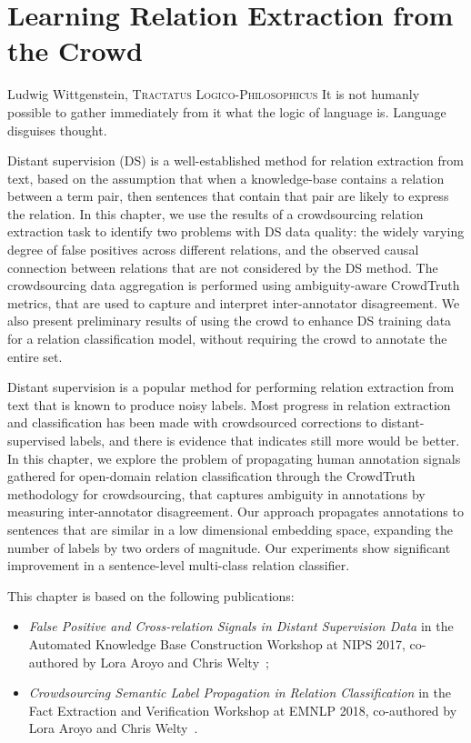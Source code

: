 \chapter{Learning Relation Extraction from the Crowd}
\label{chap:od-rel-ex}

\begin{chapquote}{Ludwig Wittgenstein, \textsc{Tractatus Logico-Philosophicus}}
It is not humanly possible to gather immediately from it what the logic of language is. Language disguises thought.
\end{chapquote}

Distant supervision (DS) is a well-established method for relation extraction from text, based on the assumption that when a knowledge-base contains a relation between a term pair, then sentences that contain that pair are likely to express the relation. In this chapter, we use the results of a crowdsourcing relation extraction task to identify two problems with DS data quality: the widely varying degree of false positives across different relations, and the observed causal connection between relations that are not considered by the DS method. The crowdsourcing data aggregation is performed using ambiguity-aware CrowdTruth metrics, that are used to capture and interpret inter-annotator disagreement. We also present preliminary results of using the crowd to enhance DS training data for a relation classification model, without requiring the crowd to annotate the entire set. 

Distant supervision is a popular method for performing relation extraction from text that is known to produce noisy labels.  Most progress in relation extraction and classification has been made with crowdsourced corrections to distant-supervised labels, and there is evidence that indicates still more would be better. In this chapter, we explore the problem of propagating human annotation signals gathered for open-domain relation classification through the CrowdTruth methodology for crowdsourcing, that captures ambiguity in annotations by measuring inter-annotator disagreement. Our approach propagates annotations to sentences that are similar in a low dimensional embedding space, expanding the number of labels by two orders of magnitude.  Our experiments show significant improvement in a sentence-level multi-class relation classifier.

This chapter is based on the following publications:

\begin{itemize}

\item \textit{False Positive and Cross-relation Signals in Distant Supervision Data} in the Automated Knowledge Base Construction Workshop at NIPS 2017, co-authored by Lora Aroyo and Chris Welty~\cite{dumitrache2017false};

\item \textit{Crowdsourcing Semantic Label Propagation in Relation Classification} in the Fact Extraction and Verification Workshop at EMNLP 2018, co-authored by Lora Aroyo and Chris Welty~\cite{dumitrache2018crowdsourcing}.

\end{itemize}

